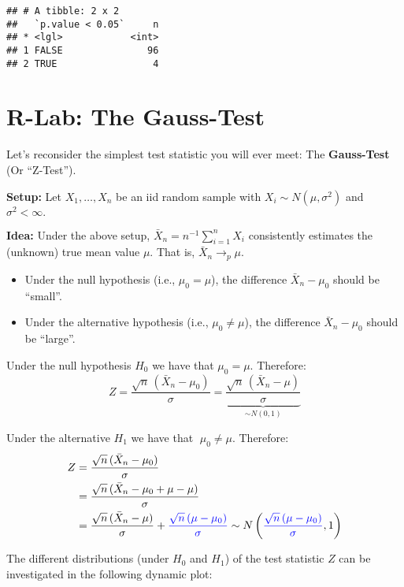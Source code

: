 \documentclass[
]{book}
\providecommand{\tightlist}{%
  \setlength{\itemsep}{0pt}\setlength{\parskip}{0pt}}
\begin{document}
\begin{verbatim}
## # A tibble: 2 x 2
##   `p.value < 0.05`     n
## * <lgl>            <int>
## 1 FALSE               96
## 2 TRUE                 4
\end{verbatim}

\hypertarget{r-lab-the-gauss-test}{%
\section{R-Lab: The Gauss-Test}\label{r-lab-the-gauss-test}}

Let's reconsider the simplest test statistic you will ever meet: The \textbf{Gauss-Test} (Or ``Z-Test'').

\textbf{Setup:} Let \(X_1,\dots,X_n\) be an iid random sample with \(X_i\sim N(\mu,\sigma^2)\) and \(\sigma^2<\infty.\)

\textbf{Idea:} Under the above setup, \(\bar{X}_n=n^{-1}\sum_{i=1}^n X_i\) consistently estimates the (unknown) true mean value \(\mu\). That is, \(\bar{X}_n\to_p\mu\).

\begin{itemize}
\tightlist
\item
  Under the null hypothesis (i.e., \(\mu_{0}=\mu\)), the difference \(\bar{X}_n-\mu_{0}\) should be ``small''.
\item
  Under the alternative hypothesis (i.e., \(\mu_{0}\neq\mu\)), the difference \(\bar{X}_n-\mu_{0}\) should be ``large''.
\end{itemize}

\hfill\break

Under the null hypothesis \(H_0\) we have that \(\mu_{0}=\mu\). Therefore:
\[
Z=\frac{\sqrt{n}\,(\bar{X}_n-\mu_{0})}{\sigma}=\underbrace{\frac{\sqrt{n}\,(\bar{X}_n-\mu)}{\sigma}}_{\sim N(0,1)}
\]

\hfill\break

Under the alternative \(H_1\) we have that \(\;\mu_{0}\neq \mu\). Therefore:
\begin{align*}
Z&=\frac{\sqrt{n}\,(\bar{X}_n-\mu_{0})}{\sigma}\\
&=\frac{\sqrt{n}\,(\bar{X}_n-\mu_{0}+\mu-\mu)}{\sigma}\\
&=\frac{\sqrt{n}\,(\bar{X}_n-\mu)}{\sigma}+{\color{blue}{ \frac{\sqrt{n}\,(\mu-\mu_{0})}{\sigma} }} \sim N\left({\color{blue}{\frac{\sqrt{n}\,(\mu-\mu_{0})}{\sigma}}},1\right)
\end{align*}

The different distributions (under \(H_0\) and \(H_1\)) of the test statistic \(Z\) can be investigated in the following dynamic plot:
\end{document}
